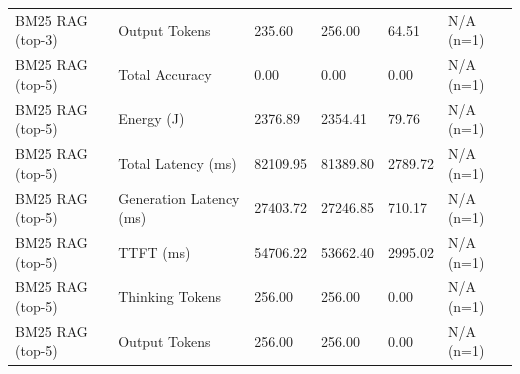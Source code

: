 \begin{table}
\begin{tabular}{llllll}
BM25 RAG (top-3) & Output Tokens & 235.60 & 256.00 & 64.51 & N/A (n=1) \\
BM25 RAG (top-5) & Total Accuracy & 0.00 & 0.00 & 0.00 & N/A (n=1) \\
BM25 RAG (top-5) & Energy (J) & 2376.89 & 2354.41 & 79.76 & N/A (n=1) \\
BM25 RAG (top-5) & Total Latency (ms) & 82109.95 & 81389.80 & 2789.72 & N/A (n=1) \\
BM25 RAG (top-5) & Generation Latency (ms) & 27403.72 & 27246.85 & 710.17 & N/A (n=1) \\
BM25 RAG (top-5) & TTFT (ms) & 54706.22 & 53662.40 & 2995.02 & N/A (n=1) \\
BM25 RAG (top-5) & Thinking Tokens & 256.00 & 256.00 & 0.00 & N/A (n=1) \\
BM25 RAG (top-5) & Output Tokens & 256.00 & 256.00 & 0.00 & N/A (n=1) \\
\bottomrule
\end{tabular}
\end{table}
